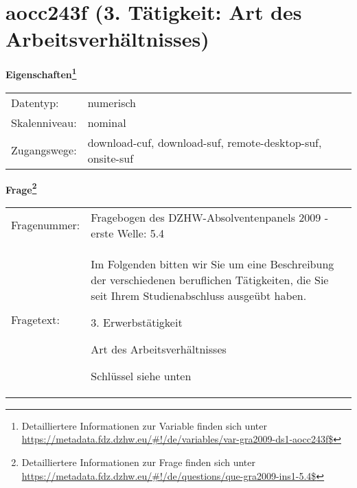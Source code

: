 
    \setcounter{footnote}{0}

    \vspace*{-1.8cm}
	\section{aocc243f (3. Tätigkeit: Art des Arbeitsverhältnisses)}
	\label{section:aocc243f}



    \vspace*{0.5cm}
    \noindent\textbf{Eigenschaften\footnote{Detailliertere Informationen zur Variable finden sich unter
		\url{https://metadata.fdz.dzhw.eu/\#!/de/variables/var-gra2009-ds1-aocc243f$}}}\\
	\begin{tabularx}{\hsize}{@{}lX}
	Datentyp: & numerisch \\
	Skalenniveau: & nominal \\
	Zugangswege: &
	  download-cuf, 
	  download-suf, 
	  remote-desktop-suf, 
	  onsite-suf
 \\
    \end{tabularx}



				\vspace*{0.5cm}
                \noindent\textbf{Frage\footnote{Detailliertere Informationen zur Frage finden sich unter
		              \url{https://metadata.fdz.dzhw.eu/\#!/de/questions/que-gra2009-ins1-5.4$}}}\\
				\begin{tabularx}{\hsize}{@{}lX}
					Fragenummer: &
					  Fragebogen des DZHW-Absolventenpanels 2009 - erste Welle:
					  5.4
 \\
					Fragetext: & Im Folgenden bitten wir Sie um eine Beschreibung der verschiedenen beruflichen Tätigkeiten, die Sie seit Ihrem Studienabschluss ausgeübt haben.\par  3. Erwerbstätigkeit\par  Art des Arbeitsverhältnisses\par  Schlüssel siehe unten \\
				\end{tabularx}





